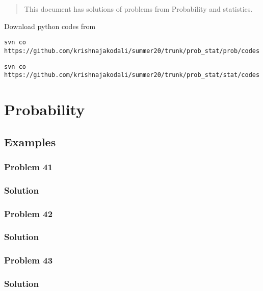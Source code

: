 \documentclass[journal,12pt,twocolumn]{IEEEtran}
\begin{document}
%
\begin{abstract}
This document has solutions of problems from Probability and statistics. 
\end{abstract}
Download python codes from 
%
\begin{lstlisting}
svn co https://github.com/krishnajakodali/summer20/trunk/prob_stat/prob/codes
\end{lstlisting}
\begin{lstlisting}
svn co https://github.com/krishnajakodali/summer20/trunk/prob_stat/stat/codes
\end{lstlisting}
%
\section{Probability}
\subsection{Examples}
\subsubsection{Problem 41}

%
\subsubsection{Solution}


\subsubsection{Problem 42}

%
\subsubsection{Solution}


\subsubsection{Problem 43}

%
\subsubsection{Solution}

\end{document}
